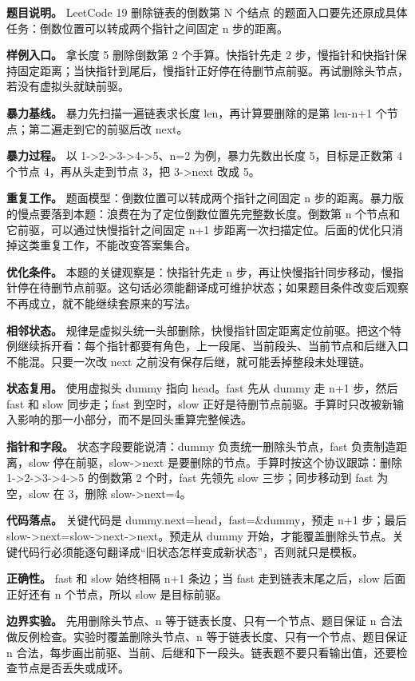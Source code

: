 \textbf{题目说明。} LeetCode 19 删除链表的倒数第 N 个结点 的题面入口要先还原成具体任务：倒数位置可以转成两个指针之间固定 n 步的距离。

\textbf{样例入口。} 拿长度 5 删除倒数第 2 个手算。快指针先走 2 步，慢指针和快指针保持固定距离；当快指针到尾后，慢指针正好停在待删节点前驱。再试删除头节点，若没有虚拟头就缺前驱。

\textbf{暴力基线。} 暴力先扫描一遍链表求长度 len，再计算要删除的是第 len-n+1 个节点；第二遍走到它的前驱后改 next。

\textbf{暴力过程。} 以 1->2->3->4->5、n=2 为例，暴力先数出长度 5，目标是正数第 4 个节点 4，再从头走到节点 3，把 3->next 改成 5。

\textbf{重复工作。} 题面模型：倒数位置可以转成两个指针之间固定 n 步的距离。暴力版的慢点要落到本题：浪费在为了定位倒数位置先完整数长度。倒数第 n 个节点和它前驱，可以通过快慢指针之间固定 n+1 步距离一次扫描定位。后面的优化只消掉这类重复工作，不能改变答案集合。

\textbf{优化条件。} 本题的关键观察是：快指针先走 n 步，再让快慢指针同步移动，慢指针停在待删节点前驱。这句话必须能翻译成可维护状态；如果题目条件改变后观察不再成立，就不能继续套原来的写法。

\textbf{相邻状态。} 规律是虚拟头统一头部删除，快慢指针固定距离定位前驱。把这个特例继续拆开看：每个指针都要有角色，上一段尾、当前段头、当前节点和后继入口不能混。只要一次改 next 之前没有保存后继，就可能丢掉整段未处理链。

\textbf{状态复用。} 使用虚拟头 dummy 指向 head。fast 先从 dummy 走 n+1 步，然后 fast 和 slow 同步走；fast 到空时，slow 正好是待删节点前驱。手算时只改被新输入影响的那一小部分，而不是回头重算完整候选。

\textbf{指针和字段。} 状态字段要能说清：dummy 负责统一删除头节点，fast 负责制造距离，slow 停在前驱，slow->next 是要删除的节点。手算时按这个协议跟踪：删除 1->2->3->4->5 的倒数第 2 个时，fast 先领先 slow 三步；同步移动到 fast 为空，slow 在 3，删除 slow->next=4。

\textbf{代码落点。} 关键代码是 dummy.next=head，fast=\&dummy，预走 n+1 步；最后 slow->next=slow->next->next。预走从 dummy 开始，才能覆盖删除头节点。关键代码行必须能逐句翻译成“旧状态怎样变成新状态”，否则就只是模板。

\textbf{正确性。} fast 和 slow 始终相隔 n+1 条边；当 fast 走到链表末尾之后，slow 后面正好还有 n 个节点，所以 slow 是目标前驱。

\textbf{边界实验。} 先用删除头节点、n 等于链表长度、只有一个节点、题目保证 n 合法做反例检查。实验时覆盖删除头节点、n 等于链表长度、只有一个节点、题目保证 n 合法，每步画出前驱、当前、后继和下一段头。链表题不要只看输出值，还要检查节点是否丢失或成环。

